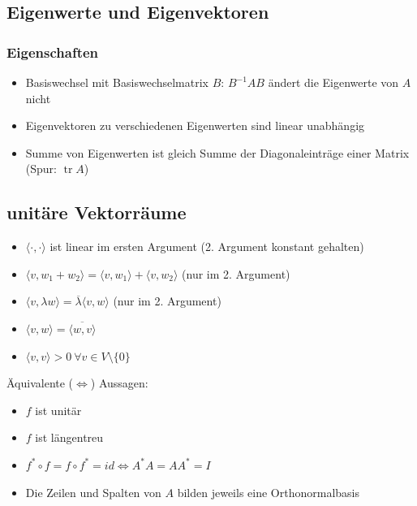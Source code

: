 \documentclass[german, fourcolumn, 8pt]{latex4ei/latex4ei_sheet}
\newcommand{\equival}[0]{\ensuremath{\Longleftrightarrow}}
\DeclareMathOperator{\tr}{tr}
\begin{document}
\begin{sectionbox}
    \subsection{Eigenwerte und Eigenvektoren}
    \subsubsection{Eigenschaften}
    \begin{itemize}
        \item Basiswechsel mit Basiswechselmatrix $B$: $B^{-1}AB$ ändert die Eigenwerte von $A$ nicht
        \item Eigenvektoren zu verschiedenen Eigenwerten sind linear unabhängig
        \item Summe von Eigenwerten ist gleich Summe der Diagonaleinträge einer Matrix (Spur: $\tr A$)
    \end{itemize}
\end{sectionbox}

\subsection{unitäre Vektorräume}
\begin{itemize}
    \item $\langle \cdot, \cdot \rangle$ ist linear im ersten Argument (2. Argument konstant gehalten)
    \item $\langle v,w_1+w_2\rangle = \langle v,w_1\rangle + \langle v,w_2 \rangle$ (nur im 2. Argument)
    \item $\langle v, \lambda w\rangle = \overline \lambda \langle v,w \rangle$ (nur im 2. Argument)
    \item $\langle v,w \rangle = \overline{\langle w,v \rangle}$
    \item $\langle v,v \rangle > 0 \ \forall v \in V\setminus \{0\}$
\end{itemize}
\begin{sectionbox}
    Äquivalente (\equival) Aussagen:
    \begin{itemize}
        \item $f$ ist unitär
        \item $f$ ist längentreu
        \item $f^* \circ f=f \circ f^*=id \equival A^*A=AA^*=I$
        \item Die Zeilen und Spalten von $A$ bilden jeweils eine Orthonormalbasis
    \end{itemize}
\end{sectionbox}
\end{document}
